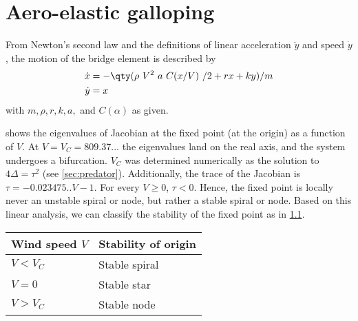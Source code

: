 \graphicspath{{../figures/4/}}


\chapter{Aero-elastic galloping}

From Newton's second law and the definitions of linear acceleration $\ddot{y}$ and speed $\dot{y}$, the motion of the bridge element is described by
%
\begin{align*}
\dot{x} &= - \qty(\rho\ V^2\ a\ C(x/V)\ /2  +  r x  +  k y) / m \\
\dot{y} &= x
\end{align*}
%
with $m, \rho, r, k, a, $ and $C(\alpha)$ as given.


 shows the eigenvalues of Jacobian at the fixed point (at the origin) as a function of $V$. At $V = V_C = 809.37...$ the eigenvalues land on the real axis, and the system undergoes a bifurcation. $V_C$ was determined numerically as the solution to $4 \Delta = \tau^2$ (see \cref{sec:predator}). Additionally, the trace of the Jacobian is $\tau = -0.023475.. V − 1$. For every $V \geq 0$, $\tau < 0$. Hence, the fixed point is locally never an unstable spiral or node, but rather a stable spiral or node. Based on this linear analysis, we can classify the stability of the fixed point as in \cref{tab:fp_class}.

\begin{figure}
\label{fig:eigencup}
\end{figure}

\begin{table}
\begin{tabular}{@{}ll@{}} \toprule
Wind speed $V$  & Stability of origin \\\midrule
$V < V_C$  &      Stable spiral  \\[1em]
$V = 0$    &      Stable star  \\[1em]
$V > V_C$  &      Stable node  \\[1em]
\bottomrule
\end{tabular}
\label{tab:fp_class}
\end{table}


\begin{figure}
\label{fig:bridge_phase}
\end{figure}
